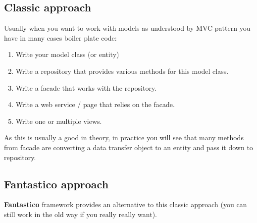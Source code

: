 \documentclass[letterpaper,10pt,english]{sphinxmanual}
\begin{document}
\subsection{Classic approach}
\label{features/mvc:classic-approach}
Usually when you want to work with models as understood by MVC pattern you have in many cases boiler plate code:
\begin{enumerate}
\item {} 
Write your model class (or entity)

\item {} 
Write a repository that provides various methods for this model class.

\item {} 
Write a facade that works with the repository.

\item {} 
Write a web service / page that relies on the facade.

\item {} 
Write one or multiple views.

\end{enumerate}

As this is usually a good in theory, in practice you will see that many methods from facade are converting a data transfer object
to an entity and pass it down to repository.


\subsection{Fantastico approach}
\label{features/mvc:fantastico-approach}
\textbf{Fantastico} framework provides an alternative to this classic approach (you can still work in the old way if you really really
want).
\end{document}
